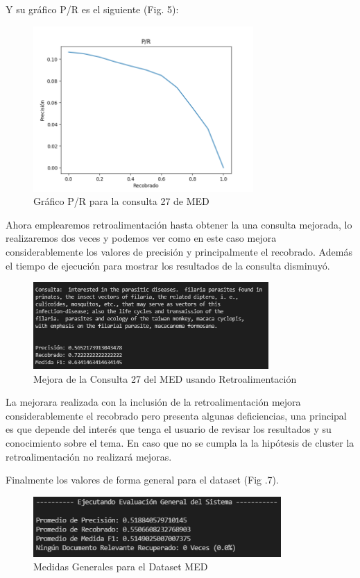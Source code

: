 \documentclass[runningheads,a4paper]{llncs}
\begin{document}
Y su gráfico P/R es el siguiente (Fig. 5):

\begin{figure}
	\centering
	\includegraphics[height=6.3cm]{imgs/pr_query27_med.png}
	\caption{Gráfico P/R para la consulta 27 de MED}
	\label{fig:med1pr}
\end{figure}

Ahora emplearemos retroalimentación hasta obtener la una consulta mejorada, lo realizaremos dos veces y podemos ver como en este caso mejora considerablemente los valores de precisión y principalmente el recobrado. Además el tiempo de ejecución para mostrar los resultados de la consulta disminuyó.

\begin{figure}
	\centering
	\includegraphics[height=3.3cm]{imgs/rocchio_query27_med.png}
	\caption{Mejora de la Consulta 27 del MED usando Retroalimentación}
	\label{fig:med1roc}
\end{figure}

La mejorara realizada con la inclusión de la retroalimentación mejora considerablemente el recobrado pero presenta algunas deficiencias, una principal es que depende del interés que tenga el usuario de revisar los resultados y su conocimiento sobre el tema. En caso que no se cumpla la la hipótesis de cluster la retroalimentación no realizará mejoras. \newpage

Finalmente los valores de forma general para el dataset (Fig .7). 

\begin{figure}
	\centering
	\includegraphics[height=2.3cm]{imgs/eval_general_med.png}
	\caption{Medidas Generales para el Dataset MED}
	\label{fig:med1gen}
\end{figure}
\end{document}
